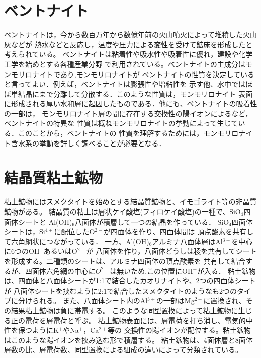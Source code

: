 ﻿\section{ベントナイト}
ベントナイトは，今から数百万年から数億年前の火山噴火によって堆積した火山灰などが
熱水などと反応し，温度や圧力による変性を受けて鉱床を形成したと考えられている。
ベントナイトは粘着性や吸水性や吸着性に優れ，建設や化学工学を始めとする各種産業分野
で利用されている。ベントナイトの主成分はモンモリロナイトであり,モンモリロナイトが
ベントナイトの性質を決定していると言ってよい．例えば，ベントナイトは膨張性や増粘性を
示す他、水中ではほぼ単結晶にまで分離して分散する．このような性質は，モンモリロナイト
表面に形成される厚い水和層に起因したものである．他にも、ベントナイトの吸着性の一部は，
モンモリロナイト層の間に存在する交換性の陽イオンによるなど，ベントナイトの特異な
性質は概ねモンモリロナイトの挙動によって生じている．このことから，ベントナイトの
性質を理解するためには，モンモリロナイト含水系の挙動を詳しく調べることが必要となる．
\section{結晶質粘土鉱物}
粘土鉱物にはスメクタイトを始めとする結晶質鉱物と、イモゴライト等の非晶質鉱物がある。
結晶質の粘土は層状ケイ酸塩(フィロケイ酸塩)の一種で、SiO$_4$四面体シートと
Al(OH)$_6$八面体が積層して一つの結晶を作っている．
SiO$_4$四面体シートは，Si$^{4+}$に配位したO$^{2-}$が四面体を作り、四面体間は
頂点酸素を共有して六角網状につながっている．
一方、Al(OH)$_6$アルミナ八面体層はAl$^{3+}$を中心に6つのOH$^-$あるいはO$^{2-}$が
八面体を作り，八面体どうしは稜を共有してシートを形成する。二種類のシートは、アルミナ四面体の頂点酸素を
共有して結合するが、四面体六角網の中心に$O^{2-}$は無いため,この位置にOH$^-$が入る．
粘土鉱物は、四面体と八面体シートが1:1で結合したカオリナイトや、2つの四面体シートが
八面体シートを挟むように2:1で結合したスメクタイトのようなも2つのタイプに分けられる。
また、八面体シート内のAl$^{3+}$の一部はMg$^{2+}$に置換され、その結果粘土鉱物は負に帯電する。
このような同型置換によって粘土鉱物に生じる正の電荷を層電荷と呼ぶ。
粘土鉱物表面には、層電荷を打ち消し、電気的中性を保つようにK$^+$やNa$^+$，Ca$^{2+}$等の
交換性の陽イオンが配位する。粘土鉱物はこのような陽イオンを挟み込む形で積層する。
粘土鉱物は、4面体層と8面体層数の比、層電荷数、同型置換による組成の違いによって分類されている。
